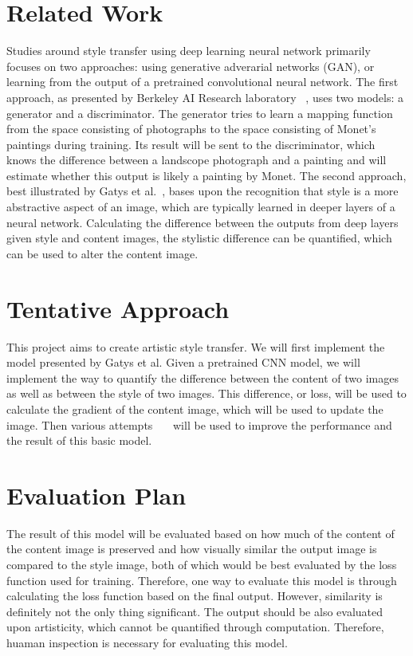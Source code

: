 \documentclass[10pt,twocolumn,letterpaper]{article}
\begin{document}
\section{Related Work}
Studies around style transfer using deep learning neural network primarily focuses on two approaches: using generative adverarial networks (GAN), or learning from the output of a pretrained convolutional neural network. The first approach, as presented by Berkeley AI Research laboratory ~\cite{zhu}, uses two models: a generator and a discriminator. The generator tries to learn a mapping function from the space consisting of photographs to the space consisting of Monet's paintings during training. Its result will be sent to the discriminator, which knows the difference between a landscope photograph and a painting and will estimate whether this output is likely a painting by Monet. The second approach, best illustrated by Gatys et al.~\cite{Gatys}, bases upon the recognition that style is a more abstractive aspect of an image, which are typically learned in deeper layers of a neural network. Calculating the difference between the outputs from deep layers given style and content images, the stylistic difference can be quantified, which can be used to alter the content image. 

\section{Tentative Approach}
This project aims to create artistic style transfer. We will first implement the model presented by Gatys et al. Given a pretrained CNN model, we will implement the way to quantify the difference between the content of two images as well as between the style of two images. This difference, or loss, will be used to calculate the gradient of the content image, which will be used to update the image. Then various attempts~\cite{Johnson}~\cite{Ulyanov}~\cite{Ulyanov2} will be used to improve the performance and the result of this basic model. 

\section{Evaluation Plan}
The result of this model will be evaluated based on how much of the content of the content image is preserved and how visually similar the output image is compared to the style image, both of which would be best evaluated by the loss function used for training. Therefore, one way to evaluate this model is through calculating the loss function based on the final output. However, similarity is definitely not the only thing significant. The output should be also evaluated upon artisticity, which cannot be quantified through computation. Therefore, huaman inspection is necessary for evaluating this model. 

{\small


}
\end{document}
